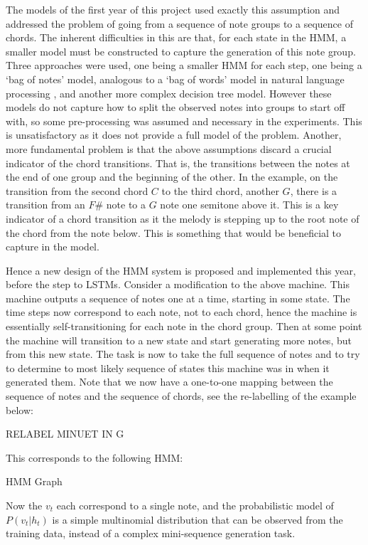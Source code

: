 \documentclass[bsc,singlespacing,logo, parskip, deptreport]{infthesis}
\begin{document}
The models of the first year of this project used exactly this assumption and addressed the problem of going from a sequence of note groups to a sequence of chords. The inherent difficulties in this are that, for each state in the HMM, a smaller model must be constructed to capture the generation of this note group. Three approaches were used, one being a smaller HMM for each step, one being a `bag of notes' model, analogous to a `bag of words' model in natural language processing \cite{bag of words}, and another more complex decision tree model. However these models do not capture how to split the observed notes into groups to start off with, so some pre-processing was assumed and necessary in the experiments. This is unsatisfactory as it does not provide a full model of the problem. Another, more fundamental problem is that the above assumptions discard a crucial indicator of the chord transitions. That is, the transitions between the notes at the end of one group and the beginning of the other. In the example, on the transition from the second chord $C$ to the third chord, another $G$, there is a transition from an $F\#$ note to a $G$ note one semitone above it. This is a key indicator of a chord transition as it the melody is stepping up to the root note of the chord from the note below. This is something that would be beneficial to capture in the model.

Hence a new design of the HMM system is proposed and implemented this year, before the step to LSTMs. Consider a modification to the above machine. This machine outputs a sequence of notes one at a time, starting in some state. The time steps now correspond to each note, not to each chord, hence the machine is essentially self-transitioning for each note in the chord group. Then at some point the machine will transition to a new state and start generating more notes, but from this new state. The task is now to take the full sequence of notes and to try to determine to most likely sequence of states this machine was in when it generated them. Note that we now have a one-to-one mapping between the sequence of notes and the sequence of chords, see the re-labelling of the example below:

RELABEL MINUET IN G

This corresponds to the following HMM:

HMM Graph

Now the $v_t$ each correspond to a single note, and the probabilistic model of $P(v_t | h_t)$ is a simple multinomial distribution that can be observed from the training data, instead of a complex mini-sequence generation task.
\end{document}
